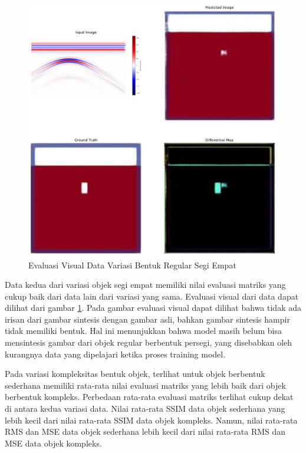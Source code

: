 \documentclass[conference]{IEEEtran}
\begin{document}
\begin{figure}[ht]
  \centering
  \includegraphics[scale=0.15]{gambar/diffMapSegi4.jpg}
  \caption{Evaluasi Visual Data Variasi Bentuk Regular Segi Empat}
  \label{fig:diffmapsegi4}
\end{figure}

Data kedua dari variasi objek segi empat memiliki nilai evaluasi matriks yang cukup baik dari data lain dari variasi yang sama. 
Evaluasi visual dari data dapat dilihat dari gambar \ref{fig:diffmapsegi4}. 
Pada gambar evaluasi visual dapat dilihat bahwa tidak ada irisan dari gambar sintesis dengan gambar asli, bahkan gambar sintesis hampir tidak memiliki bentuk. 
Hal ini menunjukkan bahwa model masih belum bisa mensintesis gambar dari objek regular berbentuk persegi, yang disebabkan oleh kurangnya data yang dipelajari ketika proses training model.

Pada variasi kompleksitas bentuk objek, terlihat untuk objek berbentuk sederhana memiliki rata-rata nilai evaluasi matriks yang lebih baik dari objek berbentuk kompleks. 
Perbedaan rata-rata evaluasi matriks terlihat cukup dekat di antara kedua variasi data.  
Nilai rata-rata SSIM data objek sederhana yang lebih kecil dari nilai rata-rata SSIM data objek kompleks. 
Namun, nilai rata-rata RMS dan MSE data objek sederhana lebih kecil dari nilai rata-rata RMS dan MSE data objek kompleks. 
\end{document}

